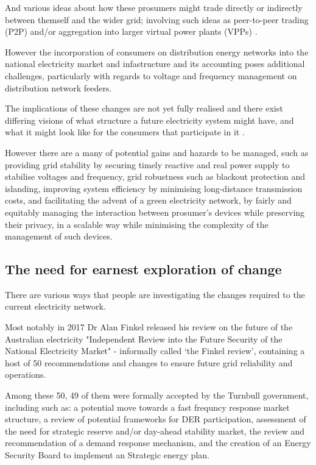 And various ideas about how these prosumers might trade directly or indirectly between themself and the wider grid; involving such ideas as peer-to-peer trading (P2P) and/or aggregation into larger virtual power plants (VPPs) \cite{Morstyn2018}.

However the incorporation of consumers on distribution energy networks into the national electricity market and infastructure and its accounting poses additional challenges, particularly with regards to voltage and frequency management on distribution network feeders.

The implications of these changes are not yet fully realised and there exist differing visions of what structure a future electricity system might have, and what it might look like for the consumers that participate in it \cite{Parag2016}.

However there are a many of potential gains and hazards to be managed, such as providing grid stability by securing timely reactive and real power supply to stabilise voltages and frequency, grid robustness such as blackout protection and islanding, improving system efficiency by minimising long-distance transmission costs, and facilitating the advent of a green electricity network, by fairly and equitably managing the interaction between prosumer's devices while preserving their privacy, in a scalable way while minimising the complexity of the management of such devices. \cite{BELL2018765}

\subsection{The need for earnest exploration of change}

There are various ways that people are investigating the changes required to the current electricity network.

Most notably in 2017 Dr Alan Finkel released his review on the future of the Australian electricity "Independent Review into the Future Security of the National Electricity Market" - informally called `the Finkel review', containing a host of 50 recommendations and changes to ensure future grid reliability and operations.

Among these 50, 49 of them were formally accepted by the Turnbull government, including such as: a potential move towards a fast frequncy response market structure, a review of potential frameworks for DER participation, assessment of the need for strategic reserve and/or day-ahead stability market, the review and recommendation of a demand response mechanism, and the creation of an Energy Security Board to implement an Strategic energy plan.

